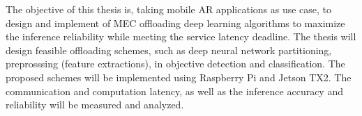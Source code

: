 The objective of this thesis is, taking mobile AR applications as use case, to design and implement of MEC offloading deep learning algorithms to maximize the inference reliability while meeting the service latency deadline. The thesis will design feasible offloading schemes, such as deep neural network partitioning, preprosssing (feature extractions), in objective detection and classification. The proposed schemes will be implemented using Raspberry Pi and Jetson TX2. The communication and computation latency, as well as the inference accuracy and reliability will be measured and analyzed.


